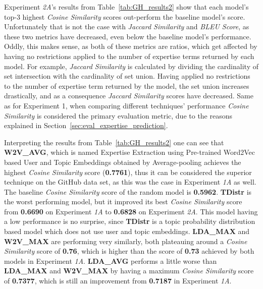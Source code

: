             Experiment \emph{2A}'s results from Table~\ref{tab:GH_results2} show that each model's top-$3$ highest \emph{Cosine Similarity} scores out-perform the baseline model's score. Unfortunately that is not the case with \emph{Jaccard Similarity} and \emph{BLEU Score}, as these two metrics have decreased, even below the baseline model's performance. Oddly, this makes sense, as both of these metrics are ratios, which get affected by having no restrictions applied to the number of expertise terms returned by each model. For example, \emph{Jaccard Similarity} is calculated by dividing the cardinality of set intersection with the cardinality of set union. Having applied no restrictions to the number of expertise term returned by the model, the set union increases drastically, and as a consequence \emph{Jaccard Similarity} scores have decreased. Same as for Experiment 1, when comparing different techniques' performance \emph{Cosine Similarity} is considered the primary evaluation metric, due to the reasons explained in Section~\ref{sec:eval_expertise_prediction}.
            
            Interpreting the results from Table~\ref{tab:GH_results2} one can see that \textbf{W2V\_AVG}, which is named Expertise Extraction using Pre-trained Word2Vec based User and Topic Embeddings obtained by Average-pooling achieves the highest \emph{Cosine Similarity} score (\textbf{0.7761}), thus it can be considered the superior technique on the GitHub data set, as this was the case in Experiment \emph{1A} as well. The baseline \emph{Cosine Similarity} score of the random model is \textbf{0.5962}. \textbf{TDistr} is the worst performing model, but it improved its best \emph{Cosine Similarity} score from \textbf{0.6690} on Experiment \emph{1A} to \textbf{0.6828} on Experiment \emph{2A}. This model having a low performance is no surprise, since \textbf{TDistr} is a topic probability distribution based model which does not use user and topic embeddings. \textbf{LDA\_MAX} and \textbf{W2V\_MAX} are performing very similarly, both plateauing around a \emph{Cosine Similarity} score of \textbf{0.76}, which is higher than the score of \textbf{0.73} achieved by both models in Experiment \emph{1A}. \textbf{LDA\_AVG} performs a little worse than \textbf{LDA\_MAX} and \textbf{W2V\_MAX} by having a maximum \emph{Cosine Similarity} score of \textbf{0.7377}, which is still an improvement from \textbf{0.7187} in Experiment \emph{1A}.
            
